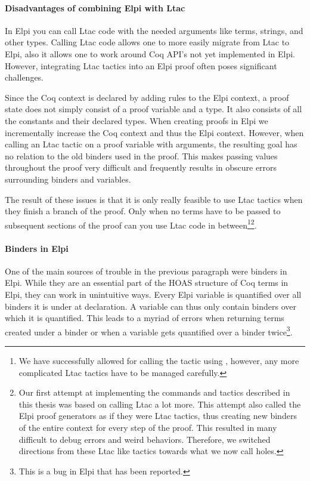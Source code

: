 \documentclass[thesis.tex]{subfiles}
\begin{document}
\paragraph{Disadvantages of combining Elpi with Ltac}
In Elpi you can call Ltac code with the needed arguments like terms, strings, and other types. Calling Ltac code allows one to more easily migrate from Ltac to Elpi, also it allows one to work around Coq API's not yet implemented in Elpi. However, integrating Ltac tactics into an Elpi proof often poses significant challenges.

Since the Coq context is declared by adding rules to the Elpi context, a proof state does not simply consist of a proof variable and a type. It also consists of all the constants and their declared types. When creating proofs in Elpi we incrementally increase the Coq context and thus the Elpi context. However, when calling an Ltac tactic on a proof variable with arguments, the resulting goal has no relation to the old binders used in the proof. This makes passing values throughout the proof very difficult and frequently results in obscure errors surrounding binders and variables.

The result of these issues is that it is only really feasible to use Ltac tactics when they finish a branch of the proof. Only when no terms have to be passed to subsequent sections of the proof can you use Ltac code in between\footnote{We have successfully allowed for calling the  tactic using , however, any more complicated Ltac tactics have to be managed carefully.}\footnote{Our first attempt at implementing the commands and tactics described in this thesis was based on calling Ltac a lot more. This attempt also called the Elpi proof generators as if they were Ltac tactics, thus creating new binders of the entire context for every step of the proof. This resulted in many difficult to debug errors and weird behaviors. Therefore, we switched directions from these Ltac like tactics towards what we now call holes.}.

\paragraph{Binders in Elpi}
One of the main sources of trouble in the previous paragraph were binders in Elpi. While they are an essential part of the HOAS structure of Coq terms in Elpi, they can work in unintuitive ways. Every Elpi variable is quantified over all binders it is under at declaration. A variable can thus only contain binders over which it is quantified. This leads to a myriad of errors when returning terms created under a binder or when a variable gets quantified over a binder twice\footnote{This is a bug in Elpi that has been reported.}.
\end{document}

